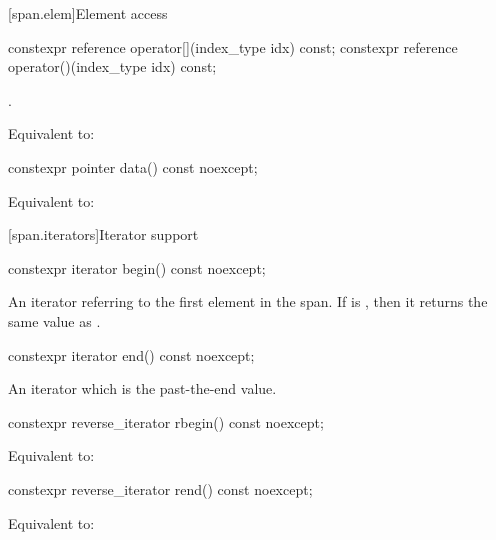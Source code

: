 \begin{codeblock}
\begin{codeblock}
\begin{codeblock}
[span.elem]{Element access}

%
%
\begin{itemdecl}
constexpr reference operator[](index_type idx) const;
constexpr reference operator()(index_type idx) const;
\end{itemdecl}
\begin{itemdescr}
\pnum
\requires
{}.

\pnum
\effects
Equivalent to: 
\end{itemdescr}

%
\begin{itemdecl}
constexpr pointer data() const noexcept;
\end{itemdecl}
\begin{itemdescr}
\pnum
\effects
Equivalent to: 
\end{itemdescr}

[span.iterators]{Iterator support}

%
\begin{itemdecl}
constexpr iterator begin() const noexcept;
\end{itemdecl}
\begin{itemdescr}
\pnum
\returns
An iterator referring to the first element in the span.
If  is , then it returns the
same value as .
\end{itemdescr}

%
\begin{itemdecl}
constexpr iterator end() const noexcept;
\end{itemdecl}
\begin{itemdescr}
\pnum
\returns
An iterator which is the past-the-end value.
\end{itemdescr}

%
\begin{itemdecl}
constexpr reverse_iterator rbegin() const noexcept;
\end{itemdecl}
\begin{itemdescr}
\pnum
\effects
Equivalent to: 
\end{itemdescr}

%
\begin{itemdecl}
constexpr reverse_iterator rend() const noexcept;
\end{itemdecl}
\begin{itemdescr}
\pnum
\returns
Equivalent to: 
\end{itemdescr}


\end{codeblock}
\end{codeblock}
\end{codeblock}
